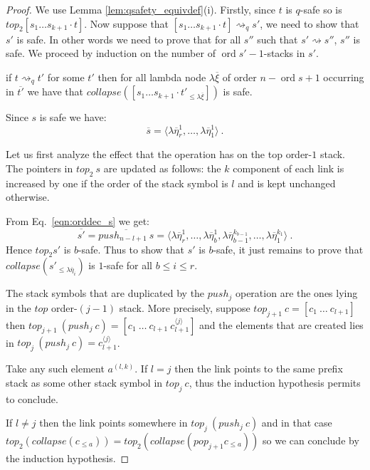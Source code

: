 \documentclass{article}
\newcommand{\ord}{\mathop{\mathrm{ord}}}
\newcommand{\prefixof}{\leqslant}
\theoremstyle{remark}
\theoremstyle{definition}
\newcommand\orddec\overline
\newcommand\saferel\rightsquigarrow
\begin{document}
\begin{proof}
We use Lemma \ref{lem:qsafety_equivdef}(i). Firstly, since $t$ is
$q$-safe so is $top_2 [s_1 \ldots s_{k+1} \cdot t]$. Now suppose
that $[s_1 \ldots s_{k+1} \cdot t] \saferel_q s'$, we need to show
that $s'$ is safe. In other words we need to prove that for all
$s''$ such that $s' \saferel s''$, $s''$ is safe. We proceed by
induction on the number of $\ord{s'}-1$-stacks in $s'$.

\hrulefill

 if $t\saferel_q t'$ for some $t'$ then for all lambda node
$\lambda \overline{\xi}$ of order $n-\ord{s}+1$ occurring in
$\orddec{t'}$ we have that $collapse([s_1 \ldots s_{k+1} \cdot
t'_{\prefixof{\lambda \overline{\xi}}}])$ is safe.


\hrulefill

Since $s$ is safe we have:
\begin{equation}
 \orddec{s} = \langle \lambda \overline{\eta}_r^1
, \ldots, \lambda \overline{\eta}_1^1   \rangle \ . \label{eqn:orddec_s}
\end{equation}

Let us first analyze the effect that the operation has on the top
order-$1$ stack. The pointers in $top_2\ s$ are updated as follows:
the $k$ component of each link is increased by one if the order of
the stack symbol is $l$ and is kept unchanged otherwise.

From Eq.\ \ref{eqn:orddec_s} we get:
\begin{equation}
\orddec{s'} = \orddec{push_{n-l+1}\ s} = \langle
\lambda \overline{\eta}_r^1
, \ldots,  \lambda \overline{\eta}_{b}^1, \lambda \overline{\eta}_{b-1}^{k_{b-1}}, \ldots,
 \lambda \overline{\eta}_1^{k_{1}} \rangle
\ . \label{eqn:orddec_pushj_s}
\end{equation}
Hence $top_2 s'$ is $b$-safe. Thus to show that $s'$ is $b$-safe, it
just remains to prove that $collapse(s'_{\prefixof \lambda
\overline{\eta}_{i}})$ is $1$-safe for all $b \leq i \leq r$.

\hrulefill

The stack symbols that are duplicated by the $push_j$ operation are
the ones lying in the $top$ order-$(j-1)$ stack. More precisely,
suppose $top_{j+1}\ c = [c_1\ \ldots\ c_{l+1}]$ then $top_{j+1}\
(push_j\ c) = [c_1\ \ldots\ c_{l+1}\ c_{l+1}^{\langle j \rangle}]$
and the elements that are created lies in $top_j\ (push_j\ c) =
c_{l+1}^{\langle j \rangle}$.

Take any such element $a^{(l,k)}$. If $l=j$ then the link points to
the same prefix stack as some other stack symbol in $top_j\ c$, thus
the induction hypothesis permits to conclude.

If $l \neq j$ then the link points somewhere in $top_j\ (push_j\ c)$
and in that case $top_2( collapse(c_{\prefixof{a}})) = top_2(
collapse( pop_{j+1} c_{\prefixof{a}}))$ so we can conclude by the
induction hypothesis.


\hrulefill

\end{proof}
\end{document}
